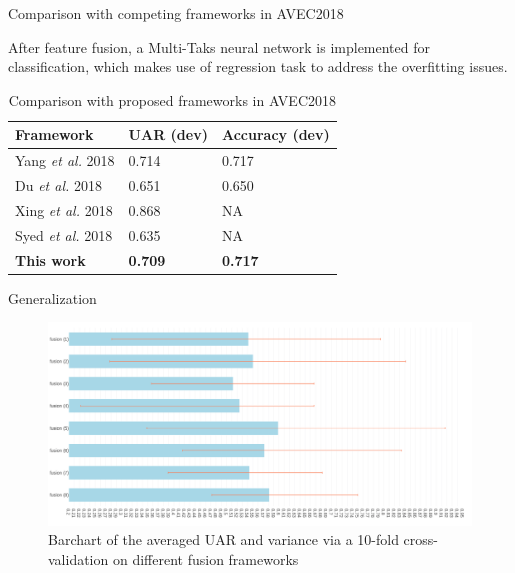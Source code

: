 \documentclass{beamer}
\begin{document}
\begin{frame}{Comparison with competing frameworks in AVEC2018}

After feature fusion, a Multi-Taks neural network is implemented for classification, which makes use of regression task to address the overfitting issues.

\begin{table}[h]
    \small
    \centering
    \caption{Comparison with proposed frameworks in AVEC2018}
    \begin{tabular}{l|l|l}
    \hline
    \hline
        Framework & UAR (dev) & Accuracy (dev) \\
        \hline
        Yang \textit{et al.} 2018 & 0.714 & 0.717 \\
        \hline
        Du \textit{et al.} 2018 & 0.651 & 0.650 \\
        \hline
        Xing \textit{et al.} 2018 & 0.868 & NA \\
        \hline
        Syed \textit{et al.} 2018 & 0.635 & NA \\
        \hline
        \textbf{This work} & \textbf{0.709} & \textbf{0.717} \\
    \hline
    \hline
    \end{tabular}
    \label{tab:avec2018_compare}
\end{table}
    
\end{frame}


\begin{frame}{Generalization}


\begin{figure}[htb]
    \centering
    \includegraphics[width=\textwidth]{images/barchart_cv.png}
    \caption{Barchart of the averaged UAR and variance via a 10-fold cross-validation on different fusion frameworks}
    \label{fig:errorbar}
\end{figure}

\end{frame}
\end{document}
